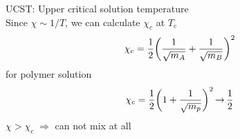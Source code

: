 \documentclass[a4paper]{article}
\DeclareMathOperator{\ra}{\rightarrow}
\DeclareMathOperator{\dra}{\Rightarrow}
\begin{document}
UCST: Upper critical solution temperature\\
Since $ \chi \sim 1/T $, we can calculate $ \chi_c $ at $ T_c $
\begin{equation}\label{key}
\chi_c = \dfrac{1}{2}\qty(\dfrac{1}{\sqrt{m_A}} + \dfrac{1}{\sqrt{m_B}})^2
\end{equation}
for polymer solution
\begin{equation}\label{key}
\chi_c = \dfrac{1}{2}\qty(1 + \dfrac{1}{\sqrt{m_p}})^2 \ra \dfrac{1}{2}
\end{equation}
$ \chi > \chi_c \;\dra$ can not mix at all\\ 
\end{document}
